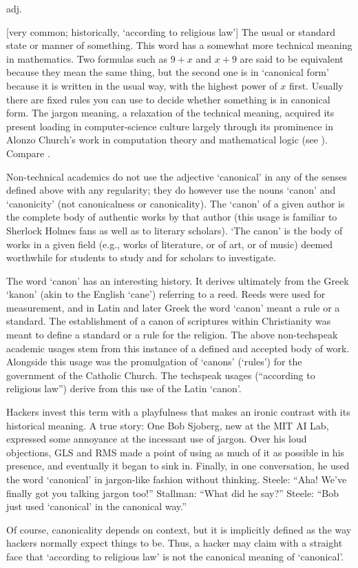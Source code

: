  adj.

[very common; historically, `according to religious law'] The usual or standard
state or manner of something. This word has a somewhat more technical meaning in
mathematics. Two formulas such as $9+x$ and $x+9$ are said to be equivalent
because they mean the same thing, but the second one is in `canonical form'
because it is written in the usual way, with the highest power of $x$ first.
Usually there are fixed rules you can use to decide whether something is in
canonical form. The jargon meaning, a relaxation of the technical meaning,
acquired its present loading in computer-science culture largely through its
prominence in Alonzo Church's work in computation theory and mathematical logic
(see ). Compare .

Non-technical academics do not use the adjective `canonical' in any of the
senses defined above with any regularity; they do however use the nouns `canon'
and `canonicity' (not canonicalness or canonicality). The `canon' of a given author is the complete body of
authentic works by that author (this usage is familiar to Sherlock Holmes fans
as well as to literary scholars). `The canon' is the body of works in a given
field (e.g., works of literature, or of art, or of music) deemed worthwhile for
students to study and for scholars to investigate.

The word `canon' has an interesting history. It derives ultimately from the
Greek `kanon' (akin to the English `cane') referring to a reed. Reeds were used
for measurement, and in Latin and later Greek the word `canon' meant a rule or a
standard. The establishment of a canon of scriptures within Christianity was
meant to define a standard or a rule for the religion. The above non-techspeak
academic usages stem from this instance of a defined and accepted body of work.
Alongside this usage was the promulgation of `canons' (`rules') for the
government of the Catholic Church. The techspeak usages (``according to
religious law'') derive from this use of the Latin `canon'.

Hackers invest this term with a playfulness that makes an ironic contrast with
its historical meaning. A true story: One Bob Sjoberg, new at the MIT AI Lab,
expressed some annoyance at the incessant use of jargon. Over his loud
objections, GLS and RMS made a point of using as much of it as possible in his
presence, and eventually it began to sink in. Finally, in one conversation, he
used the word `canonical' in jargon-like fashion without thinking. Steele:
``Aha! We've finally got you talking jargon too!'' Stallman: ``What did he
say?'' Steele: ``Bob just used `canonical' in the canonical way.''

Of course, canonicality depends on context, but it is implicitly defined as the
way hackers normally expect things to be. Thus, a hacker may claim with a
straight face that `according to religious law' is not the canonical meaning of
`canonical'.

